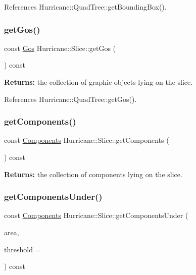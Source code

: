 References Hurricane\+::\+Quad\+Tree\+::get\+Bounding\+Box().

\mbox{\label{classHurricane_1_1Slice_abc257f5b91c01c01a618787fd73db97b}} 
\subsubsection{\texorpdfstring{get\+Gos()}{getGos()}}
{\footnotesize\ttfamily const \mbox{\hyperlink{namespaceHurricane_a4456a34f3bc6766d471c3064ace19759}{Gos}} Hurricane\+::\+Slice\+::get\+Gos (\begin{DoxyParamCaption}{ }\end{DoxyParamCaption}) const\hspace{0.3cm}{\ttfamily [inline]}}

{\bfseries Returns\+:} the collection of graphic objects lying on the slice. 

References Hurricane\+::\+Quad\+Tree\+::get\+Gos().

\mbox{\label{classHurricane_1_1Slice_afe7c766d33e16461c3667af88e64773e}} 
\subsubsection{\texorpdfstring{get\+Components()}{getComponents()}}
{\footnotesize\ttfamily const \mbox{\hyperlink{namespaceHurricane_a7d26d99aeb5dd6d70d51bd35d2473e72}{Components}} Hurricane\+::\+Slice\+::get\+Components (\begin{DoxyParamCaption}{ }\end{DoxyParamCaption}) const}

{\bfseries Returns\+:} the collection of components lying on the slice. \mbox{\label{classHurricane_1_1Slice_ada51a63690db8912eb58f1f33aa9f62c}} 
\subsubsection{\texorpdfstring{get\+Components\+Under()}{getComponentsUnder()}}
{\footnotesize\ttfamily const \mbox{\hyperlink{namespaceHurricane_a7d26d99aeb5dd6d70d51bd35d2473e72}{Components}} Hurricane\+::\+Slice\+::get\+Components\+Under (\begin{DoxyParamCaption}\item[{const \mbox{\hyperlink{classHurricane_1_1Box}{Box}} \&}]{area,  }\item[{\mbox{\hyperlink{group__DbUGroup_ga4fbfa3e8c89347af76c9628ea06c4146}{Db\+U\+::\+Unit}}}]{threshold = {} }\end{DoxyParamCaption}) const}

